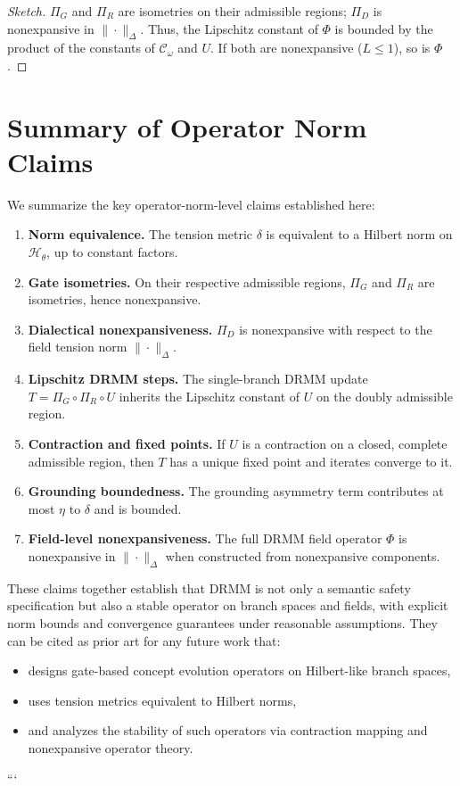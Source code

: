 \documentclass[11pt, a4paper]{article}
\begin{document}
\begin{proof}[Sketch]
$\Pi_G$ and $\Pi_R$ are isometries on their admissible regions; $\Pi_D$ is nonexpansive in $\|\cdot\|_{\Delta}$.
Thus, the Lipschitz constant of $\Phi$ is bounded by the product of the constants of $\mathcal{C}_\omega$ and $U$.
If both are nonexpansive ($L\le1$), so is $\Phi$.
\end{proof}

\section{Summary of Operator Norm Claims}

We summarize the key operator-norm-level claims established here:

\begin{enumerate}[label=(O\arabic*),nosep]
  \item \textbf{Norm equivalence.} The tension metric $\delta$ is equivalent to a Hilbert norm on $\mathcal{H}_\theta$, up to constant factors.
  \item \textbf{Gate isometries.} On their respective admissible regions, $\Pi_G$ and $\Pi_R$ are isometries, hence nonexpansive.
  \item \textbf{Dialectical nonexpansiveness.} $\Pi_D$ is nonexpansive with respect to the field tension norm $\|\cdot\|_{\Delta}$.
  \item \textbf{Lipschitz DRMM steps.} The single-branch DRMM update $T=\Pi_G\circ\Pi_R\circ U$ inherits the Lipschitz constant of $U$ on the doubly admissible region.
  \item \textbf{Contraction and fixed points.} If $U$ is a contraction on a closed, complete admissible region, then $T$ has a unique fixed point and iterates converge to it.
  \item \textbf{Grounding boundedness.} The grounding asymmetry term contributes at most $\eta$ to $\delta$ and is bounded.
  \item \textbf{Field-level nonexpansiveness.} The full DRMM field operator $\Phi$ is nonexpansive in $\|\cdot\|_{\Delta}$ when constructed from nonexpansive components.
\end{enumerate}

These claims together establish that DRMM is not only a semantic safety specification but also a stable operator on branch spaces and fields, with explicit norm bounds and convergence guarantees under reasonable assumptions.
They can be cited as prior art for any future work that:
\begin{itemize}[nosep]
  \item designs gate-based concept evolution operators on Hilbert-like branch spaces,
  \item uses tension metrics equivalent to Hilbert norms,
  \item and analyzes the stability of such operators via contraction mapping and nonexpansive operator theory.
\end{itemize}
```
\nocite{*}
  
  
\end{document}
